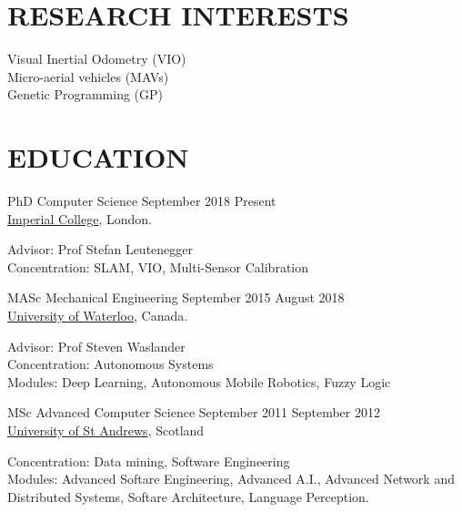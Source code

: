 \documentclass[line,margin]{cv}
\begin{document}

\address{Email: \href{mailto:chutsu@gmail.com}{chutsu@gmail.com}}
\address{Website: \href{http://chutsu.github.io}{http://chutsu.github.io}}


\begin{resume}

\section{RESEARCH INTERESTS}
Visual Inertial Odometry (VIO) \\
Micro-aerial vehicles (MAVs) \\
Genetic Programming (GP)



\section{EDUCATION}
PhD Computer Science
\hfill September 2018 \textemdash{} Present \\
\href{http://www.imperial.ac.uk}{Imperial College}, London.

\vspace{0.1em}
\begin{adjustwidth}{2.0em}{2.0em}
	Advisor: Prof Stefan Leutenegger \\
	Concentration: SLAM, VIO, Multi-Sensor Calibration
\end{adjustwidth}


MASc Mechanical Engineering
\hfill September 2015 \textemdash{} August 2018 \\
\href{http://www.uwaterloo.ca}{University of Waterloo}, Canada.

\vspace{0.1em}
\begin{adjustwidth}{2.0em}{2.0em}
	Advisor: Prof Steven Waslander \\
	Concentration: Autonomous Systems \\
	Modules: Deep Learning, Autonomous Mobile Robotics, Fuzzy Logic
\end{adjustwidth}


MSc Advanced Computer Science
\hfill September 2011 \textemdash{} September 2012 \\
\href{http://www.st-andrews.ac.uk}{University of St Andrews}, Scotland

\vspace{0.1em}
\begin{adjustwidth}{2.0em}{2.0em}
	Concentration: Data mining, Software Engineering \\
	Modules: Advanced Softare Engineering, Advanced A.I., Advanced Network
	and Distributed Systems, Softare Architecture, Language Perception.
\end{adjustwidth}



\end{resume}
\end{document}
